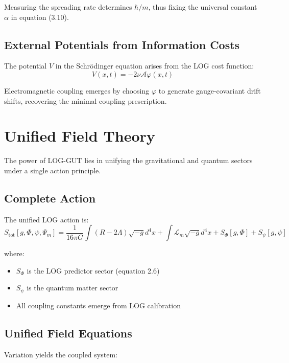 \documentclass[12pt]{article}
\begin{document}
Measuring the spreading rate determines $\hbar/m$, thus fixing the universal constant $\alpha$ in equation (3.10).

\subsection{External Potentials from Information Costs}

The potential $V$ in the Schrödinger equation arises from the LOG cost function:
\begin{equation}
V(x,t) = -2\nu\mathcal{A}\varphi(x,t) \tag{3.15}
\end{equation}

Electromagnetic coupling emerges by choosing $\varphi$ to generate gauge-covariant drift shifts, recovering the minimal coupling prescription.

\section{Unified Field Theory}

The power of LOG-GUT lies in unifying the gravitational and quantum sectors under a single action principle.

\subsection{Complete Action}

The unified LOG action is:
\begin{equation}
S_{\mathrm{tot}}[g,\Phi,\psi,\Psi_m] = \frac{1}{16\pi G}\int (R - 2\Lambda)\sqrt{-g}d^4x + \int \mathcal{L}_m \sqrt{-g}d^4x + S_\Phi[g,\Phi] + S_\psi[g,\psi] \tag{4.1}
\end{equation}

where:
\begin{itemize}
    \item $S_\Phi$ is the LOG predictor sector (equation 2.6)
    \item $S_\psi$ is the quantum matter sector
    \item All coupling constants emerge from LOG calibration
\end{itemize}

\subsection{Unified Field Equations}

Variation yields the coupled system:
\end{document}
